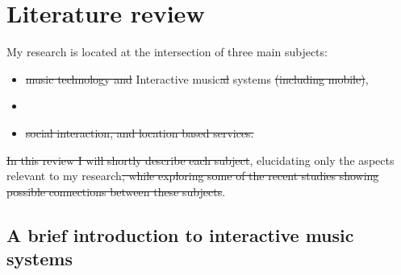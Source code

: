 \section{Literature review}

My research is located at the intersection of three main subjects:
\begin{itemize}
	\item \st{music technology and} Interactive music\st{al} systems \st{ (including mobile)},
	\item {}
	\item {} \st{social interaction, and location based services.}
\end{itemize}
\st{In this review I will shortly describe each subject}, elucidating only the aspects relevant to my research\st{, while exploring some of the recent studies showing possible connections between these subjects}. 

\subsection{A brief introduction to interactive music systems}


